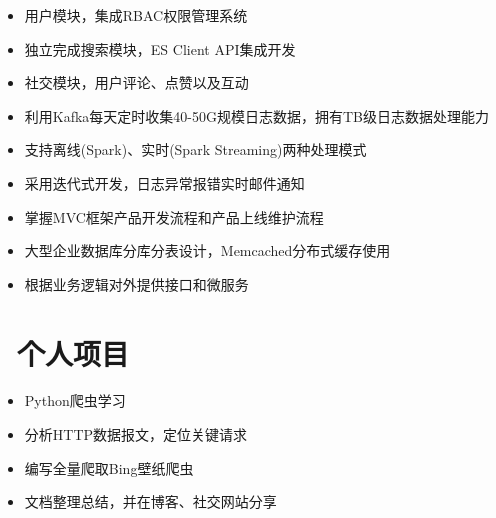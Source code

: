 \documentclass{resume}
\begin{document}
    \begin{onehalfspacing}
        \begin{itemize}
            \item 用户模块，集成RBAC权限管理系统
            \item 独立完成搜索模块，ES Client API集成开发
            \item 社交模块，用户评论、点赞以及互动
        \end{itemize}
    \end{onehalfspacing}
    \blankline{ }

    \begin{onehalfspacing}
        \begin{itemize}
            \item 利用Kafka每天定时收集40-50G规模日志数据，拥有TB级日志数据处理能力
            \item 支持离线(Spark)、实时(Spark Streaming)两种处理模式
            \item 采用迭代式开发，日志异常报错实时邮件通知
        \end{itemize}
    \end{onehalfspacing}
    \blankline{ }

    \begin{onehalfspacing}
        \begin{itemize}
            \item 掌握MVC框架产品开发流程和产品上线维护流程
            \item 大型企业数据库分库分表设计，Memcached分布式缓存使用
            \item 根据业务逻辑对外提供接口和微服务
        \end{itemize}
    \end{onehalfspacing}
    \blankline{ }

    \section{\faBriefcase\ 个人项目}
    \begin{onehalfspacing}
        \begin{itemize}
            \item Python爬虫学习
            \item 分析HTTP数据报文，定位关键请求
            \item 编写全量爬取Bing壁纸爬虫
            \item 文档整理总结，并在博客、社交网站分享
        \end{itemize}
    \end{onehalfspacing}
\end{document}
